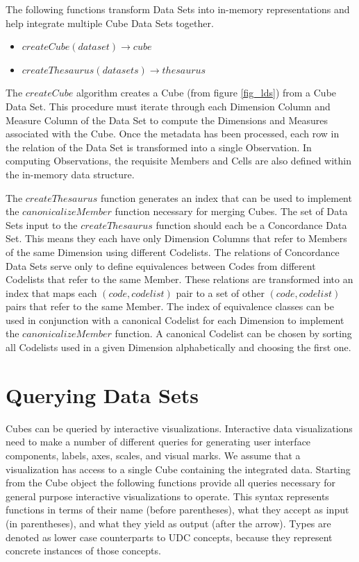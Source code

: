 The following functions transform Data Sets into in-memory representations and help integrate multiple Cube Data Sets together.

\begin{itemize}
\item $createCube(dataset) \rightarrow cube$
\item $createThesaurus(datasets) \rightarrow thesaurus$
\end{itemize}

The $createCube$ algorithm creates a Cube (from figure \ref{fig_lds}) from a Cube Data Set. This procedure must iterate through each Dimension Column and Measure Column of the Data Set to compute the Dimensions and Measures associated with the Cube. Once the metadata has been processed, each row in the relation of the Data Set is transformed into a single Observation. In computing Observations, the requisite Members and Cells are also defined within the in-memory data structure.

The $createThesaurus$ function generates an index that can be used to implement the $canonicalizeMember$ function necessary for merging Cubes. The set of Data Sets input to the $createThesaurus$ function should each be a Concordance Data Set. This means they each have only Dimension Columns that refer to Members of the same Dimension using different Codelists. The relations of Concordance Data Sets serve only to define equivalences between Codes from different Codelists that refer to the same Member. These relations are transformed into an index that maps each $(code, codelist)$ pair to a set of other $(code, codelist)$ pairs that refer to the same Member. The index of equivalence classes can be used in conjunction with a canonical Codelist for each Dimension to implement the $canonicalizeMember$ function. A canonical Codelist can be chosen by sorting all Codelists used in a given Dimension alphabetically and choosing the first one.

\section{Querying Data Sets}
Cubes can be queried by interactive visualizations. Interactive data visualizations need to make a number of different queries for generating user interface components, labels, axes, scales, and visual marks. We assume that a visualization has access to a single Cube containing the integrated data. Starting from the Cube object the following functions provide all queries necessary for general purpose interactive visualizations to operate. This syntax represents functions in terms of their name (before parentheses), what they accept as input (in parentheses), and what they yield as output (after the arrow). Types are denoted as lower case counterparts to UDC concepts, because they represent concrete instances of those concepts.

